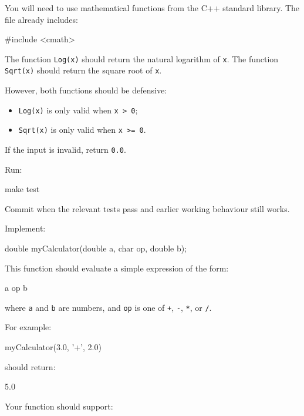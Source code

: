 \documentclass{csc2059practical}
\begin{document}
You will need to use mathematical functions from the C++ standard library. The file already includes:

\begin{cppcode}
#include <cmath>
\end{cppcode}

The function \texttt{Log(x)} should return the natural logarithm of \texttt{x}. The function \texttt{Sqrt(x)} should return the square root of \texttt{x}.

However, both functions should be defensive:

\begin{itemize}
  \item \texttt{Log(x)} is only valid when \texttt{x > 0};
  \item \texttt{Sqrt(x)} is only valid when \texttt{x >= 0}.
\end{itemize}

If the input is invalid, return \texttt{0.0}.

Run:

\begin{bashcode}
make test
\end{bashcode}

Commit when the relevant tests pass and earlier working behaviour still works.


Implement:

\begin{cppcode}
double myCalculator(double a, char op, double b);
\end{cppcode}

This function should evaluate a simple expression of the form:

\begin{terminal}
a op b
\end{terminal}

where \texttt{a} and \texttt{b} are numbers, and \texttt{op} is one of \texttt{+}, \texttt{-}, \texttt{*}, or \texttt{/}.

For example:

\begin{cppcode}
myCalculator(3.0, '+', 2.0)
\end{cppcode}

should return:

\begin{terminal}
5.0
\end{terminal}

Your function should support:
\end{document}
